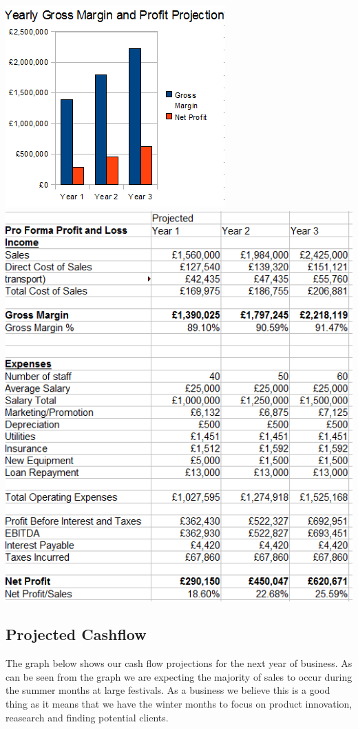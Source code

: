 \documentclass{article}
\begin{document}
\includegraphics[scale=1.0]{grossMarginAndProfitProjection.png} \\
\includegraphics[scale=1.0]{proFormaProfit3Years.png}

\subsection{Projected Cashflow}

The graph below shows our cash flow projections for the next year of business. As can be seen from the graph we are expecting the majority of sales to occur during the summer months at large festivals. As a business we believe this is a good thing as it means that we have the winter months to focus on product innovation, reasearch and finding potential clients.
\end{document}
